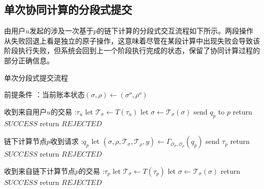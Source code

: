 \subsection{单次协同计算的分段式提交}
由用户$u$发起的涉及一次基于$p$的链下计算的分段式交互流程如下所示。两段操作从失败回退上看是独立的原子操作，这意味着尽管在某段计算中出现失败会导致该阶段执行失败，但系统会回到上一个阶段执行完成的状态，保留了协同计算过程的部分正确信息。
\begin{breakablealgorithm}
    \caption{单次分段式提交流程}
    \label{alg:ch4-1}
    \begin{algorithmic} 
        \item[前提条件]：当前账本状态$(\sigma, \rho) \leftarrow (\sigma^o, \rho^o)$
        \item[收到来自用户$u$的交易]:$\tau_u$
        \STATE let $\mathcal{T}_\sigma \leftarrow T(\tau_u)$
        \STATE let $\sigma \leftarrow \mathcal{T}_\sigma(\sigma)$
        \STATE send $q_p$ to $p$
        \STATE return $SUCCESS$
        \ENDIF
        \STATE return $REJECTED$
        \item[链下计算节点$p$收到请求]:$q_p$
        \STATE let $(\sigma, \rho, \mathcal{T}_\sigma, \mathcal{T}_\rho, y) \leftarrow \Gamma_{\mathcal{O}_\sigma, \mathcal{O}_\rho}(q_p)$
        \IF {$\sigma \neq \perp \wedge \rho \neq \perp$} 
        \STATE send $\tau_p$
        \STATE return $SUCCESS$
        \ENDIF
        \STATE return $REJECTED$
        \item[收到来自链下计算节点$p$的交易]:$\tau_p$
        \STATE let $\mathcal{T}_\sigma \leftarrow T(\tau_p)$
        \STATE let $\sigma \leftarrow \mathcal{T}_\sigma(\sigma)$
        \STATE return $SUCCESS$
        \ENDIF
        \STATE return $REJECTED$
    \end{algorithmic}
\end{breakablealgorithm}

